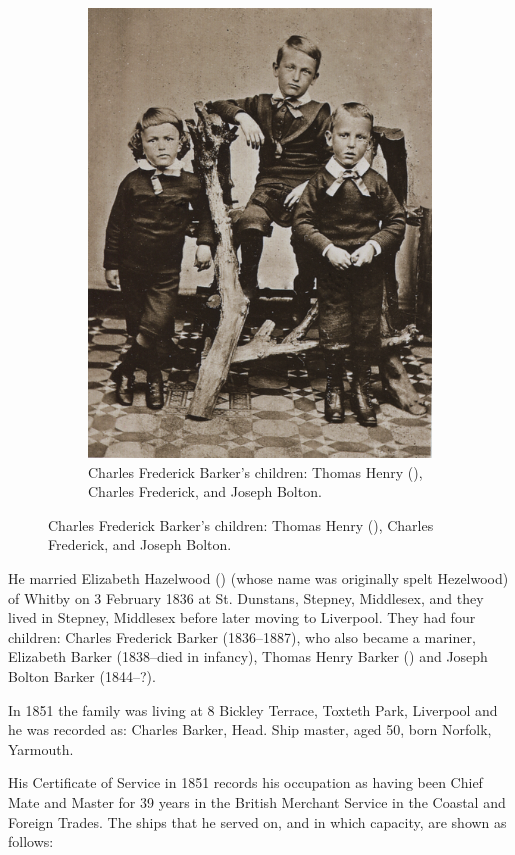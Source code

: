 \begin{figure}
\begin{subfigure}{.48\textwidth}
		\includegraphics{photos/CFB_children.png}
		\caption{Charles Frederick Barker's children: Thomas Henry (), Charles Frederick, and Joseph Bolton.}
	\end{subfigure}
\end{figure}

He married Elizabeth Hazelwood () (whose name was originally spelt Hezelwood) of Whitby on 3 February 1836 at St. Dunstans, Stepney, Middlesex, and they lived in Stepney, Middlesex before later moving to Liverpool. They had four children: Charles Frederick Barker (1836--1887), who also became a mariner, Elizabeth Barker (1838--died in infancy), Thomas Henry Barker () and Joseph Bolton Barker (1844--?). 

In 1851 the family was living at 8 Bickley Terrace, Toxteth Park, Liverpool and he was recorded as:
Charles Barker, Head. Ship master, aged 50, born Norfolk, Yarmouth. \cite{CFB1851}

His Certificate of Service in 1851 records his occupation as having been Chief Mate and Master for 39 years in the British Merchant Service in the Coastal and Foreign Trades. The ships that he served on, and in which capacity,  are shown as follows:

